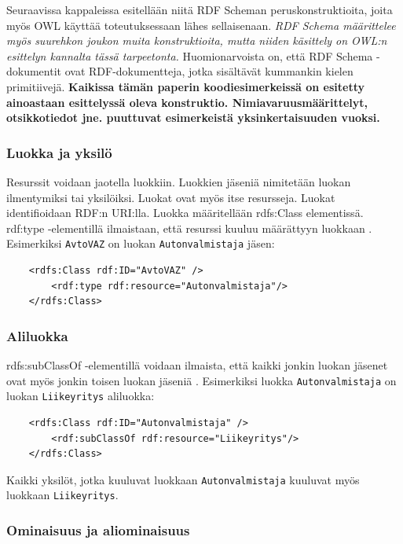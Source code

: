 \documentclass[finnish]{tktltiki2}
\theoremstyle{definition}
\theoremstyle{remark}
\begin{document}
Seuraavissa kappaleissa esitellään niitä RDF Scheman peruskonstruktioita, 
joita myös OWL käyttää toteutuksessaan lähes sellaisenaan. \emph{RDF Schema määrittelee myös suurehkon joukon muita konstruktioita, mutta niiden käsittely on OWL:n esittelyn kannalta tässä tarpeetonta.} 
Huomionarvoista on, että RDF Schema -dokumentit ovat RDF-dokumentteja, jotka sisältävät kummankin kielen primitiivejä. \textbf{Kaikissa tämän paperin koodiesimerkeissä on esitetty ainoastaan esittelyssä oleva konstruktio. Nimiavaruusmäärittelyt, otsikkotiedot jne. puuttuvat esimerkeistä yksinkertaisuuden vuoksi.}   

\subsubsection{Luokka ja yksilö}
Resurssit voidaan jaotella luokkiin. Luokkien jäseniä nimitetään luokan ilmentymiksi tai yksilöiksi\cite{RDFS}. Luokat ovat myös itse resursseja. Luokat identifioidaan RDF:n URI:lla. Luokka määritellään rdfs:Class elementissä. rdf:type -elementillä ilmaistaan, että resurssi kuuluu määrättyyn luokkaan \cite{RDFS}. Esimerkiksi \texttt{AvtoVAZ} on luokan \texttt{Autonvalmistaja} jäsen:
\begin{verbatim}
    <rdfs:Class rdf:ID="AvtoVAZ" />
        <rdf:type rdf:resource="Autonvalmistaja"/>
    </rdfs:Class>
\end{verbatim} 

\subsubsection{Aliluokka}
rdfs:subClassOf -elementillä voidaan ilmaista, että kaikki jonkin luokan jäsenet ovat myös jonkin toisen luokan jäseniä \cite{RDFS}. Esimerkiksi 
luokka \texttt{Autonvalmistaja} on luokan \texttt{Liikeyritys} aliluokka:
\begin{verbatim}
    <rdfs:Class rdf:ID="Autonvalmistaja" />
        <rdf:subClassOf rdf:resource="Liikeyritys"/>
    </rdfs:Class>
\end{verbatim}
Kaikki yksilöt, jotka kuuluvat luokkaan \texttt{Autonvalmistaja} kuuluvat myös luokkaan \texttt{Liikeyritys}.

\subsubsection{Ominaisuus ja aliominaisuus}
\end{document}
